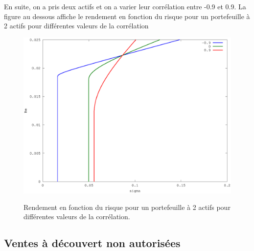 \documentclass[a4paper,11pt]{article}
\begin{document}
En suite, on  a pris deux actifs et  on a varier leur corrélation  entre -0.9 et
0.9.  La  figure au dessous affiche le  rendement en fonction du  risque pour un
portefeuille à 2 actifs pour différentes valeurs de la corrélation

\begin{figure}[h!]
  \begin{centering}
    \includegraphics[scale=0.4]{rho.eps}
    \label{rspro2}
    \par\end{centering}
  \caption{Rendement en fonction du risque pour un portefeuille à 2 actifs pour différentes valeurs de la corrélation.}
  \label{fig:jacobi-conv}
\end{figure}

\newpage
\subsection{Ventes à découvert non autorisées}
\end{document}
